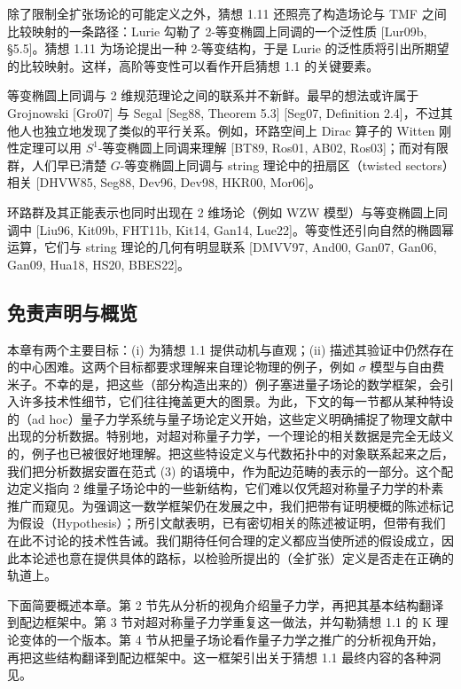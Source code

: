 除了限制全扩张场论的可能定义之外，猜想 1.11 还照亮了构造场论与 TMF 之间比较映射的一条路径：Lurie 勾勒了 2-等变椭圆上同调的一个泛性质 [Lur09b, §5.5]。猜想 1.11 为场论提出一种 2-等变结构，于是 Lurie 的泛性质将引出所期望的比较映射。这样，高阶等变性可以看作开启猜想 1.1 的关键要素。

\begin{remark}[1.12]
等变椭圆上同调与 2 维规范理论之间的联系并不新鲜。最早的想法或许属于 Grojnowski [Gro07] 与 Segal [Seg88, Theorem 5.3] [Seg07, Definition 2.4]，不过其他人也独立地发现了类似的平行关系。例如，环路空间上 Dirac 算子的 Witten 刚性定理可以用 $S^1$-等变椭圆上同调来理解 [BT89, Ros01, AB02, Ros03]；而对有限群，人们早已清楚 $G$-等变椭圆上同调与 string 理论中的扭扇区（twisted sectors）相关 [DHVW85, Seg88, Dev96, Dev98, HKR00, Mor06]。

环路群及其正能表示也同时出现在 2 维场论（例如 WZW 模型）与等变椭圆上同调中 [Liu96, Kit09b, FHT11b, Kit14, Gan14, Lue22]。等变性还引向自然的椭圆幂运算，它们与 string 理论的几何有明显联系 [DMVV97, And00, Gan07, Gan06, Gan09, Hua18, HS20, BBES22]。
\end{remark}

\subsection{免责声明与概览}
本章有两个主要目标：(i) 为猜想 1.1 提供动机与直观；(ii) 描述其验证中仍然存在的中心困难。这两个目标都要求理解来自理论物理的例子，例如 $\sigma$ 模型与自由费米子。不幸的是，把这些（部分构造出来的）例子塞进量子场论的数学框架，会引入许多技术性细节，它们往往掩盖更大的图景。为此，下文的每一节都从某种特设的（ad hoc）量子力学系统与量子场论定义开始，这些定义明确捕捉了物理文献中出现的分析数据。特别地，对超对称量子力学，一个理论的相关数据是完全无歧义的，例子也已被很好地理解。把这些特设定义与代数拓扑中的对象联系起来之后，我们把分析数据安置在范式 (3) 的语境中，作为配边范畴的表示的一部分。这个配边定义指向 2 维量子场论中的一些新结构，它们难以仅凭超对称量子力学的朴素推广而窥见。为强调这一数学框架仍在发展之中，我们把带有证明梗概的陈述标记为假设（Hypothesis）；所引文献表明，已有密切相关的陈述被证明，但带有我们在此不讨论的技术性告诫。我们期待任何合理的定义都应当使所述的假设成立，因此本论述也意在提供具体的路标，以检验所提出的（全扩张）定义是否走在正确的轨道上。

下面简要概述本章。第 2 节先从分析的视角介绍量子力学，再把其基本结构翻译到配边框架中。第 3 节对超对称量子力学重复这一做法，并勾勒猜想 1.1 的 K 理论变体的一个版本。第 4 节从把量子场论看作量子力学之推广的分析视角开始，再把这些结构翻译到配边框架中。这一框架引出关于猜想 1.1 最终内容的各种洞见。


